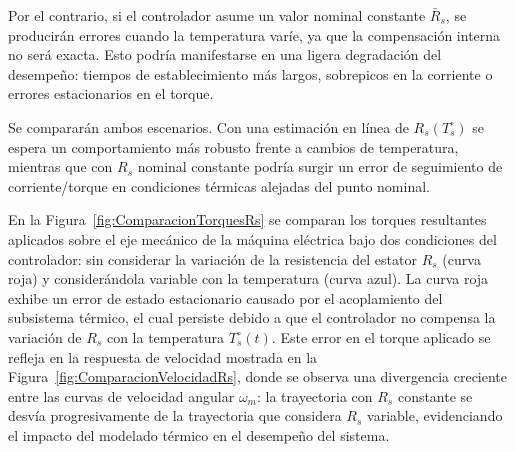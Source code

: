 \documentclass{article}
\begin{document}
Por el contrario, si el controlador asume un valor nominal constante \(\bar{R}_s\), se producirán errores cuando la temperatura varíe, ya que la compensación interna no será exacta. Esto podría manifestarse en una ligera degradación del desempeño: tiempos de establecimiento más largos, sobrepicos en la corriente o errores estacionarios en el torque.

Se compararán ambos escenarios. Con una estimación en línea de \( R_s(T_s^\circ) \) se espera un comportamiento más robusto frente a cambios de temperatura, mientras que con \( R_s \) nominal constante podría surgir un error de seguimiento de corriente/torque en condiciones térmicas alejadas del punto nominal.

En la Figura~\ref{fig:ComparacionTorquesRs} se comparan los torques resultantes aplicados sobre el eje mecánico de la máquina eléctrica bajo dos condiciones del controlador: sin considerar la variación de la resistencia del estator \(R_s\) (curva roja) y considerándola variable con la temperatura (curva azul). La curva roja exhibe un error de estado estacionario causado por el acoplamiento del subsistema térmico, el cual persiste debido a que el controlador no compensa la variación de \(R_s\) con la temperatura \(T^\circ_s(t)\). Este error en el torque aplicado se refleja en la respuesta de velocidad mostrada en la Figura~\ref{fig:ComparacionVelocidadRs}, donde se observa una divergencia creciente entre las curvas de velocidad angular \(\omega_m\): la trayectoria con \(R_s\) constante se desvía progresivamente de la trayectoria que considera \(R_s\) variable, evidenciando el impacto del modelado térmico en el desempeño del sistema.
\end{document}
